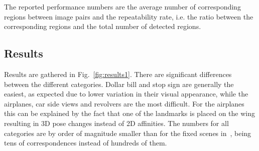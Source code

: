 \documentclass[preprint,authoryear,review]{elsarticle}
\newcommand{\commentNK}[1]{{\bf NK: #1}}
\begin{document}
The reported performance numbers are the average number of corresponding regions between
image pairs and the repeatability rate, i.e. the ratio between the corresponding 
regions and the total number of detected regions.

\subsection{Results}
Results are gathered in Fig.~\ref{fig:results1}.
There are significant differences between the different categories.
Dollar bill and stop sign are generally the easiest, as expected due to
lower variation in their visual appearance, while the airplanes, car side views and revolvers are
the most difficult. For the airplanes this
can be explained by the fact that one of the landmarks is placed on the wing resulting in
3D pose changes instead of 2D affinities.
The numbers for all categories are by order of magnitude smaller than for the fixed
scenes in~\cite{MikTuySch:2005}, being tens of correspondences instead of hundreds of
them.
%
\end{document}
